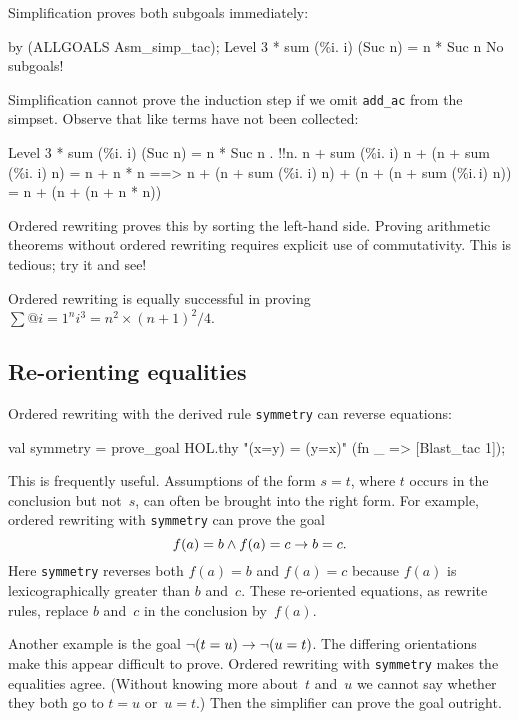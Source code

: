 Simplification proves both subgoals immediately:
\begin{ttbox}
by (ALLGOALS Asm_simp_tac);
{\out Level 3}
{ * sum (\%i. i) (Suc n) = n * Suc n}
{\out No subgoals!}
\end{ttbox}
Simplification cannot prove the induction step if we omit \texttt{add_ac} from
the simpset.  Observe that like terms have not been collected:
\begin{ttbox}
{\out Level 3}
{ * sum (\%i. i) (Suc n) = n * Suc n}
{. !!n. n + sum (\%i. i) n + (n + sum (\%i. i) n) = n + n * n}
{\out           ==> n + (n + sum (\%i. i) n) + (n + (n + sum (\%i.\,i) n)) =}
{\out               n + (n + (n + n * n))}
\end{ttbox}
Ordered rewriting proves this by sorting the left-hand side.  Proving
arithmetic theorems without ordered rewriting requires explicit use of
commutativity.  This is tedious; try it and see!

Ordered rewriting is equally successful in proving
$\sum@{i=1}^n i^3 = n^2\times(n+1)^2/4$.


\subsection{Re-orienting equalities}
Ordered rewriting with the derived rule \texttt{symmetry} can reverse
equations:
\begin{ttbox}
val symmetry = prove_goal HOL.thy "(x=y) = (y=x)"
                 (fn _ => [Blast_tac 1]);
\end{ttbox}
This is frequently useful.  Assumptions of the form $s=t$, where $t$ occurs
in the conclusion but not~$s$, can often be brought into the right form.
For example, ordered rewriting with \texttt{symmetry} can prove the goal
\[ f(a)=b \wedge f(a)=c \rightarrow b=c. \]
Here \texttt{symmetry} reverses both $f(a)=b$ and $f(a)=c$
because $f(a)$ is lexicographically greater than $b$ and~$c$.  These
re-oriented equations, as rewrite rules, replace $b$ and~$c$ in the
conclusion by~$f(a)$. 

Another example is the goal $\neg(t=u) \rightarrow \neg(u=t)$.
The differing orientations make this appear difficult to prove.  Ordered
rewriting with \texttt{symmetry} makes the equalities agree.  (Without
knowing more about~$t$ and~$u$ we cannot say whether they both go to $t=u$
or~$u=t$.)  Then the simplifier can prove the goal outright.


